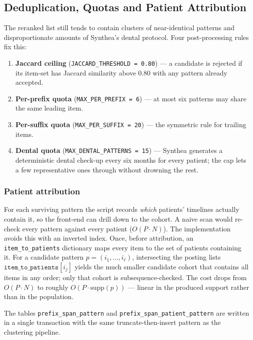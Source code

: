 \subsection{Deduplication, Quotas and Patient Attribution}
\label{subsec:dedup}

The reranked list still tends to contain clusters of near-identical patterns and disproportionate amounts of Synthea's dental protocol. Four post-processing rules fix this:
\begin{enumerate}
    \item \textbf{Jaccard ceiling} (\texttt{JACCARD\_THRESHOLD = 0.80}) --- a candidate is rejected if its item-set has Jaccard similarity above $0.80$ with any pattern already accepted.
    \item \textbf{Per-prefix quota} (\texttt{MAX\_PER\_PREFIX = 6}) --- at most six patterns may share the same leading item.
    \item \textbf{Per-suffix quota} (\texttt{MAX\_PER\_SUFFIX = 20}) --- the symmetric rule for trailing items.
    \item \textbf{Dental quota} (\texttt{MAX\_DENTAL\_PATTERNS = 15}) --- Synthea generates a deterministic dental check-up every six months for every patient; the cap lets a few representative ones through without drowning the rest.
\end{enumerate}

\subsubsection*{Patient attribution}

For each surviving pattern the script records \emph{which} patients' timelines actually contain it, so the front-end can drill down to the cohort. A naive scan would re-check every pattern against every patient ($O(P \cdot N)$). The implementation avoids this with an inverted index. Once, before attribution, an \texttt{item\_to\_patients} dictionary maps every item to the set of patients containing it. For a candidate pattern $p = (i_1, \dots, i_\ell)$, intersecting the posting lists $\texttt{item\_to\_patients}[i_j]$ yields the much smaller candidate cohort that contains all items in any order; only that cohort is subsequence-checked. The cost drops from $O(P \cdot N)$ to roughly $O(P \cdot \text{supp}(p))$ --- linear in the produced support rather than in the population.

The tables \texttt{prefix\_span\_pattern} and \texttt{prefix\_span\_patient\_pattern} are written in a single transaction with the same truncate-then-insert pattern as the clustering pipeline.
